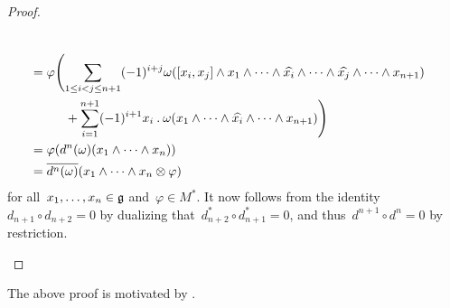\begin{proof}
\begin{enumerate}
\begin{align*}
				\\
				={}&
				\varphi
				\Biggl(
					\sum_{1 \leq i < j \leq n+1}
					(-1)^{i+j}
					\omega( [x_i, x_j] \wedge x_1 \wedge \dotsb \wedge \widehat{x_i} \wedge \dotsb \wedge \widehat{x_j} \wedge \dotsb \wedge x_{n+1} )
				\\
					{}&
					\phantom{
						\varphi\Biggl(
					}
					+
					\sum_{i=1}^{n+1}
					(-1)^{i+1}
					x_i \mathbin{.} \omega( x_1 \wedge \dotsb \wedge \widehat{x_i} \wedge \dotsb \wedge x_{n+1} )
				\Biggr)
				\\
				={}&
				\varphi( d^n(\omega)(x_1 \wedge \dotsb \wedge x_n) )
				\\
				={}&
				\overline{ d^n(\omega) } (x_1 \wedge \dotsb \wedge x_n \otimes \varphi)
			\end{align*}
			\endgroup
			for all~$x_1, \dotsc, x_n \in \mathfrak{g}$ and~$\varphi \in M^*$.
			It now follows from the identity~$d_{n+1} \circ d_{n+2} = 0$ by dualizing that~$d_{n+2}^* \circ d_{n+1}^* = 0$, and thus~$d^{n+1} \circ d^n = 0$ by restriction.
		\qedhere
	\end{enumerate}
\end{proof}


\begin{remark}
	The above proof is motivated by \cite[\S~3.1]{kumar_lie_cohomology}.
\end{remark}





